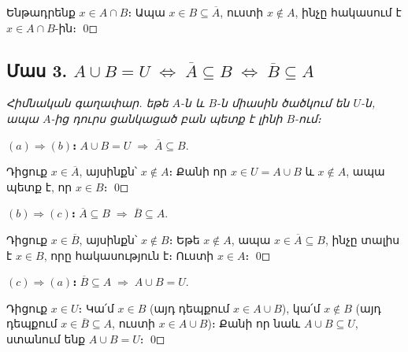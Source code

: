 \documentclass[12pt, a4paper]{article}
\newcommand{\comp}[1]{\overline{#1}}
\begin{document}
Ենթադրենք $x \in A \cap B$։ Ապա $x \in B \subseteq \comp{A}$,
ուստի $x \notin A$, ինչը հակասում է $x \in A \cap B$-ին։ \qed

\subsection*{Մաս 3.\; $A \cup B = U \;\iff\; \comp{A} \subseteq B \;\iff\; \comp{B} \subseteq A$}

\begin{center}
\end{center}

\smallskip
\textit{Հիմնական գաղափար. եթե $A$-ն և $B$-ն միասին ծածկում են $U$-ն, ապա $A$-ից դուրս ցանկացած բան պետք է լինի $B$-ում։}

\smallskip
\textbf{$(a) \Rightarrow (b)$։}\;
$A \cup B = U \;\Longrightarrow\; \comp{A} \subseteq B$.

Դիցուք $x \in \comp{A}$, այսինքն՝ $x \notin A$։
Քանի որ $x \in U = A \cup B$ և $x \notin A$, ապա պետք է, որ $x \in B$։ \qed

\textbf{$(b) \Rightarrow (c)$։}\;
$\comp{A} \subseteq B \;\Longrightarrow\; \comp{B} \subseteq A$.

Դիցուք $x \in \comp{B}$, այսինքն՝ $x \notin B$։
Եթե $x \notin A$, ապա $x \in \comp{A} \subseteq B$, ինչը տալիս է $x \in B$, որը հակասություն է։
Ուստի $x \in A$։ \qed

\textbf{$(c) \Rightarrow (a)$։}\;
$\comp{B} \subseteq A \;\Longrightarrow\; A \cup B = U$.

Դիցուք $x \in U$։ Կա՛մ $x \in B$ (այդ դեպքում $x \in A \cup B$),
կա՛մ $x \notin B$ (այդ դեպքում $x \in \comp{B} \subseteq A$, ուստի $x \in A \cup B$)։
Քանի որ նաև $A \cup B \subseteq U$, ստանում ենք $A \cup B = U$։ \qed
\end{document}
